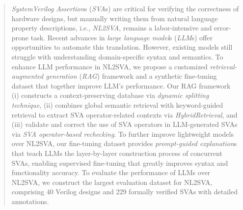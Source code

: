 \documentclass[conference,9pt]{IEEEtran}
\begin{document}
\maketitle

\begin{abstract}
\textit{SystemVerilog Assertion}s (\textit{SVA}s) are critical for verifying the correctness of hardware designs, but manually writing them from natural language property descriptions, i.e., \textit{NL2SVA}, remains a labor-intensive and error-prone task. 
Recent advances in \textit{large language model}s (\textit{LLM}s) offer opportunities to automate this translation. 
However, existing models still struggle with understanding domain-specific syntax and semantics. 
To enhance LLM performance in NL2SVA, we propose a customized \textit{retrieval-augmented generation} (\textit{RAG}) framework and a synthetic fine-tuning dataset that together improve LLM's performance. 
Our RAG framework (i) constructs a context-preserving database via \textit{dynamic splitting technique}, (ii) combines global semantic retrieval with keyword-guided retrieval to extract SVA operator-related contexts via \textit{HybridRetrieval}, and (iii) validate and correct the use of SVA operators in LLM-generated SVAs via \textit{SVA operator-based rechecking}.
To further improve lightweight models over NL2SVA, our fine-tuning dataset provides \textit{prompt-guided explanation}s that teach LLMs the layer-by-layer construction process of concurrent SVAs, enabling supervised fine-tuning that greatly improves syntax and functionality accuracy.
To evaluate the performance of LLMs over NL2SVA, we construct the largest evaluation dataset for NL2SVA, comprising $40$ Verilog designs and $229$ formally verified SVAs with detailed annotations.

\end{abstract}
\end{document}
